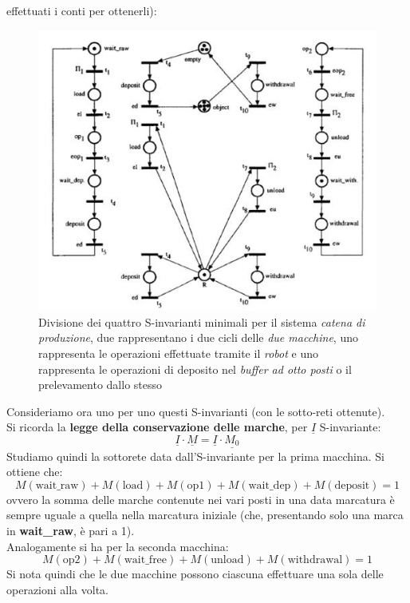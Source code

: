 \documentclass[a4paper,12pt, oneside]{book}
\begin{document}
\begin{esempio}
{    effettuati i conti per ottenerli}):
  \begin{figure}[H]
    \centering
    \includegraphics[scale = 0.59]{img/ca3.jpg}
    \caption{Divisione dei quattro S-invarianti minimali per il sistema
      \emph{catena di produzione}, due rappresentano i due cicli delle \emph{due
        macchine}, uno rappresenta le operazioni effettuate tramite il
      \emph{robot} e uno rappresenta le operazioni di deposito nel \emph{buffer
        ad otto posti} o il prelevamento dallo stesso}
  \end{figure}
  \newpage
  Consideriamo ora uno per uno questi S-invarianti (con le sotto-reti
  ottenute).\\
  Si ricorda la \textbf{legge della conservazione delle marche}, per
  $\underline{I}$ S-invariante:
  \[\underline{I}\cdot \underline{M}=\underline{I}\cdot \underline{M_0}\]
  Studiamo quindi la sottorete data dall'S-invariante per la prima macchina. Si
  ottiene che:
  \[M(\mbox{wait\_raw})+M(\mbox{load})+M(\mbox{op1})+M(\mbox{wait\_dep})+
    M(\mbox{deposit})=1\]
  ovvero la somma delle marche contenute nei vari posti in una data marcatura è
  sempre uguale a quella nella marcatura iniziale (che, presentando solo una
  marca in \textbf{wait\_raw}, è pari a 1).\\
  Analogamente si ha per la seconda macchina:
  \[M(\mbox{op2})+M(\mbox{wait\_free})+M(\mbox{unload})+M(\mbox{withdrawal})=1\]
  Si nota quindi che le due macchine possono ciascuna effettuare una sola delle
  operazioni alla volta.\\

\end{esempio}
\end{document}
